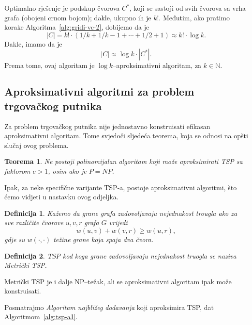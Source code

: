 \documentclass[a4paper, utf8, 11pt, colorlinks]{book}
\newtheorem{definition}{Definicija}[chapter]
\newtheorem{thm}{Teorema}[chapter]
\theoremstyle{definition}
\begin{document}
  Optimalno rješenje je podskup čvorova $C^*$, koji se sastoji od svih čvorova sa vrha grafa (obojeni crnom bojom); dakle, ukupno ih je $k!$. Međutim, ako pratimo korake Algoritma~\ref{alg:gridi-vc-2}, dobijemo 
  da je $$|C| = k!\cdot( 1/k + 1/k-1 + \cdots + 1/2 + 1) \approx k! \cdot \log k.$$  
  Dakle, imamo da je
  $$   |C| \approx \log k \cdot |C^*|.$$ Prema tome, ovaj algoritam je $\log k$--aproksimativni algoritam, za $k \in \mathbb{N}$. 
 

  \subsection{Aproksimativni algoritmi za problem trgovačkog putnika}
  
  Za problem trgovačkog putnika nije jednostavno konstruisati efikasan aproksimativni algoritam. Tome svjedoči sljedeća teorema, koja se odnosi na opšti slučaj ovog problema.
  
 \begin{thm}
    Ne postoji polinomijalan algoritam koji može aproksimirati TSP sa  faktorom $c > 1$, osim ako je $P = NP$. 
\end{thm}

Ipak, za neke specifične varijante TSP-a, postoje aproksimativni algoritmi, što ćemo vidjeti u nastavku ovog odjeljka. 
\begin{definition}
  Kažemo da grane grafa zadovoljavaju nejednakost trougla ako za sve različite čvorove $u,v, r$ grafa $G$ vrijedi
  $$ w(u,v) + w(v,r) \geq w(u,r),$$
  gdje su $w(\cdot, \cdot)$ težine grane koja spaja dva čvora.
  \end{definition}
  
  \begin{definition} 
TSP kod koga grane zadovoljavaju nejednakost truogla se naziva \emph{Metrički} TSP.
  \end{definition}
  
   Metrički TSP je i dalje NP--težak, ali se aproksimativni algoritam ipak može konstruisati. 

Posmatrajmo \emph{Algoritam najbližeg dodavanja} koji aproksimira TSP, dat Algoritmom~\ref{alg:tsp-a1}. 
  
\end{document}
